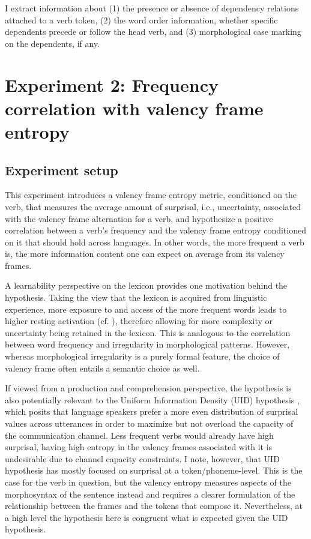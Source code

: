 I extract information about (1) the presence or absence of dependency relations attached to a verb token, (2) the word order information, whether specific dependents precede or follow the head verb, and (3) morphological case marking on the dependents, if any.


\section{Experiment 2: Frequency correlation with valency frame entropy}

\subsection{Experiment setup}

This experiment introduces a valency frame entropy metric, conditioned on the verb, that measures the average amount of surprisal, i.e., uncertainty, associated with the valency frame alternation for a verb, and hypothesize a positive correlation between a verb's frequency and the valency frame entropy conditioned on it that should hold across languages. In other words, the more frequent a verb is, the more information content one can expect on average from its valency frames.

A learnability perspective on the lexicon provides one motivation behind the hypothesis. Taking the view that the lexicon is acquired from linguistic experience, more exposure to and access of the more frequent words leads to higher resting activation (cf. \citealp*{bybee1998}), therefore allowing for more complexity or uncertainty being retained in the lexicon. This is analogous to the correlation between word frequency and irregularity in morphological patterns. However, whereas morphological irregularity is a purely formal feature, the choice of valency frame often entails a semantic choice as well.

If viewed from a production and comprehension perspective, the hypothesis is also potentially relevant to the Uniform Information Density (UID) hypothesis \citep{fenk1980,levy2006}, which posits that language speakers prefer a more even distribution of surprisal values across utterances in order to maximize but not overload the capacity of the communication channel. Less frequent verbs would already have high surprisal, having high entropy in the valency frames associated with it is undesirable due to channel capacity constraints. I note, however, that UID hypothesis has mostly focused on surprisal at a token/phoneme-level. This is the case for the verb in question, but the valency entropy measures aspects of the morphosyntax of the sentence instead and requires a clearer formulation of the relationship between the frames and the tokens that compose it. Nevertheless, at a high level the hypothesis here is congruent what is expected given the UID hypothesis.

